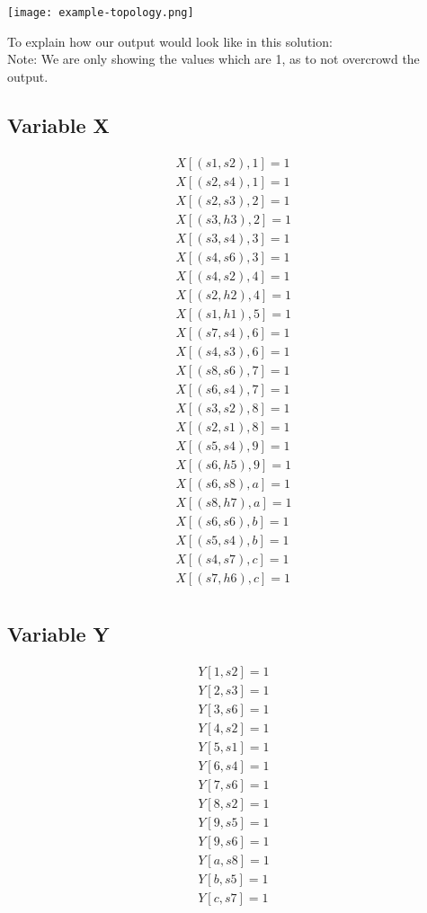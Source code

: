 \texttt{[image: example-topology.png]}

To explain how our output would look like in this solution: \\

Note: We are only showing the values which are 1, as to not overcrowd the output. \\

\subsection{Variable X}

\begin{align*}
X[(s1,s2),1] = 1 \\
X[(s2,s4),1] = 1 \\
X[(s2,s3),2] = 1 \\
X[(s3,h3),2] = 1 \\
X[(s3,s4),3] = 1 \\
X[(s4,s6),3] = 1 \\
X[(s4,s2),4] = 1 \\
X[(s2,h2),4] = 1 \\
X[(s1,h1),5] = 1 \\
X[(s7,s4),6] = 1 \\
X[(s4,s3),6] = 1 \\
X[(s8,s6),7] = 1 \\
X[(s6,s4),7] = 1 \\
X[(s3,s2),8] = 1 \\
X[(s2,s1),8] = 1 \\
X[(s5,s4),9] = 1 \\
X[(s6,h5),9] = 1 \\
X[(s6,s8),a] = 1 \\
X[(s8,h7),a] = 1 \\
X[(s6,s6),b] = 1 \\
X[(s5,s4),b] = 1 \\
X[(s4,s7),c] = 1 \\
X[(s7,h6),c] = 1 \\
\end{align*}

\subsection{Variable Y}

\begin{align*}
Y[1,s2] = 1 \\
Y[2,s3] = 1 \\
Y[3,s6] = 1 \\
Y[4,s2] = 1 \\
Y[5,s1] = 1 \\
Y[6,s4] = 1 \\
Y[7,s6] = 1 \\
Y[8,s2] = 1 \\
Y[9,s5] = 1 \\
Y[9,s6] = 1 \\
Y[a,s8] = 1 \\
Y[b,s5] = 1 \\
Y[c,s7] = 1 \\
\end{align*}


